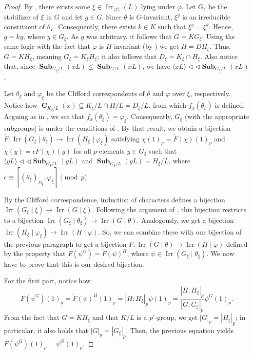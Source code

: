 \documentclass[12pt]{amsart}
\DeclareMathOperator{\CB}{\mathbf{C}}
\DeclareMathOperator{\Sub}{\mathbf{Sub}}
\DeclareMathOperator{\Irr}{Irr}
\theoremstyle{remark}
\theoremstyle{definition}
\theoremstyle{plain}
\theoremstyle{definition}
\numberwithin{equation}{section}
\begin{document}
\begin{proof}
	By , there exists some $\xi \in \Irr_{\langle x \rangle}(L)$ lying under $\varphi$. Let $G_\xi$ be the stabilizer of $\xi$ in $G$ and let $g \in G$. Since $\theta$ is $G$-invariant, $\xi^g$ is an irreducible constituent of $\theta_L$. Consequently, there exists $k \in K$ such that $\xi^g = \xi^k$. Hence, $g = ky$, where $y \in G_\xi$. As $g$ was arbitrary, it follows that $G = KG_\xi$. Using the same logic with the fact that $\varphi$ is $H$-invariant (by ) we get $H = DH_\xi$. Thus, $G = KH_\xi$, meaning $G_\xi = K_\xi H_\xi$; it also follows that $D_\xi = K_\xi \cap H_\xi$. Also notice that, since $\Sub_{G_\xi/L}(xL) \leq \Sub_{G/L}(xL)$, we have $\langle xL \rangle {\triangleleft}{\triangleleft} \Sub_{G_\xi/L}(xL)$.
	
	Let $\theta_\xi$ and $\varphi_\xi$ be the Clifford correspondents of $\theta$ and $\varphi$ over $\xi$, respectively. Notice how $\CB_{K_\xi/L}(x) \subseteq K_\xi /L \cap H/L = D_\xi/L$, from which $f_x(\theta_\xi)$ is defined. Arguing as in \cite[Theorem 3.4]{PickyPSolvable}, we see that $f_x(\theta_\xi) = \varphi_\xi$. Consequently, $G_\xi$ (with the appropriate subgroups) is under the conditions of . By that result, we obtain a bijection $\tilde{F}: \Irr(G_\xi \mid \theta_\xi) \to \Irr(H_\xi \mid \varphi_\xi)$ satisfying $\chi(1)_p = \tilde{F}(\chi)(1)_p$ and $\chi(y) = \epsilon \tilde{F}(\chi)(y)$ for all $p$-elements $y \in G_\xi$ such that $\langle yL \rangle {\triangleleft}{\triangleleft} \Sub_{G_\xi/L}(yL)$ and $\Sub_{G_\xi/L}(yL) = H_\xi/L$, where $\epsilon \equiv [(\theta_\xi)_{D_\xi}, \varphi_\xi] \pmod{p}$.
	
	By the Clifford correspondence, induction of characters defines a bijection $\Irr(G_\xi \mid \xi) \to \Irr(G \mid \xi)$. Following the argument of \cite[Theorem 3.4]{PickyPSolvable}, this bijection restricts to a bijection $\Irr(G_\xi \mid \theta_\xi) \to \Irr(G \mid \theta)$. Analogously, we get a bijection $\Irr(H_\xi \mid \varphi_\xi) \to \Irr(H \mid \varphi)$. So, we can combine these with our bijection of the previous paragraph to get a bijection $F: \Irr(G \mid \theta) \to \Irr(H \mid \varphi)$ defined by the property that $F(\psi^G) = \tilde{F}(\psi)^H$, where $\psi \in \Irr(G_{\xi} \mid \theta_\xi)$. We now have to prove that this is our desired bijection. 
	
	For the first part, notice how
	\begin{equation*}
		F(\psi^G)(1)_p = \tilde{F}(\psi)^H(1)_p = |H:H_\xi|_p\psi(1)_p = \frac{|H:H_\xi|_p}{|G:G_\xi|_p}\psi^G(1)_p.
	\end{equation*}
	From the fact that $G = KH_\xi$ and that $K/L$ is a $p'$-group, we get $|G|_p = |H_\xi|_p$; in particular, it also holds that $|G|_p = |G_\xi|_p$. Then, the previous equation yields $F(\psi^G)(1)_p = \psi^G(1)_p$. 
	

\end{proof}
\end{document}
